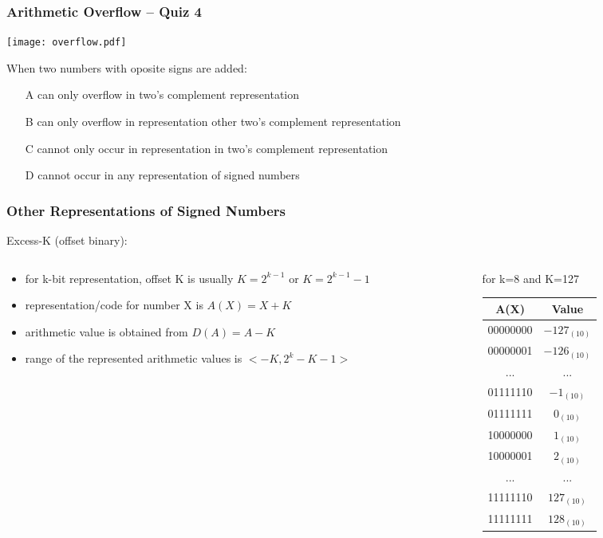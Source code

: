 \documentclass{beamer}
\begin{document}
\begin{frame}
\frametitle{Arithmetic Overflow -- Quiz 4}

\begin{center}
\texttt{[image: overflow.pdf]}
\end{center}

When two numbers with oposite signs are added:
\begin{itemize}
\item[A] can only overflow in two's complement representation
\item[B] can only overflow in representation other two's complement representation
\item[C] cannot only occur in representation in two's complement representation
\item[D] cannot occur in any representation of signed numbers
\end{itemize}
\end{frame}



\begin{frame}
\frametitle{Other Representations of Signed Numbers}

Excess-K (offset binary):

\begin{columns}
\begin{column}{0.5\textwidth}
\begin{itemize}
\item for k-bit representation, offset K is usually $K=2^{k-1}$ or $K=2^{k-1}-1$
\item representation/code for number X is $A(X) = X+K$
\item arithmetic value is obtained from $D(A) = A-K$
\item range of the represented arithmetic values is $<-K, 2^{k}-K-1>$
\end{itemize}
\end{column}
\hfill
\begin{column}{0.5\textwidth}
for k=8 and K=127
\bigskip
\begin{tabular}{|c|c|}\hline
{\small A(X)}  & {\small Value} \\\hline
00000000 & $-127_{(10)}$ \\ \hline
00000001 & $-126_{(10)}$ \\ \hline
... & ... \\\hline
01111110 & $-1_{(10)}$ \\ \hline
01111111 & $0_{(10)}$ \\ \hline
10000000 & $1_{(10)}$ \\ \hline
10000001 & $2_{(10)}$ \\ \hline
... & ... \\\hline
11111110 & $127_{(10)}$ \\ \hline
11111111 & $128_{(10)}$ \\ \hline
\end{tabular}
\end{column}
\end{columns}

\end{frame}
\end{document}
